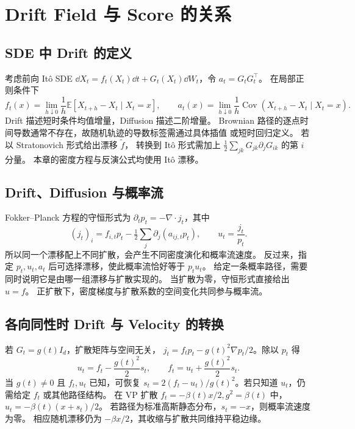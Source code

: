\section{Drift Field 与 Score 的关系}
\label{sec:fields-drift}

\subsection{SDE 中 Drift 的定义}

考虑前向 It\^o SDE
\(\dd X_t=f_t(X_t)\dd t+G_t(X_t)\dd W_t\)，令 \(a_t=G_tG_t^\top\)。
在局部正则条件下
\[
 f_t(x)=\lim_{h\downarrow0}\frac1h\mathbb E[X_{t+h}-X_t\mid X_t=x],
 \qquad
 a_t(x)=\lim_{h\downarrow0}\frac1h
       \operatorname{Cov}(X_{t+h}-X_t\mid X_t=x).
\]
Drift 描述短时条件均值增量，Diffusion 描述二阶增量。
Brownian 路径的逐点时间导数通常不存在，故随机轨迹的导数标签需通过具体插值
或短时回归定义。
若以 Stratonovich 形式给出漂移 \(\widetilde f\)，
转换到 It\^o 形式需加上
\(\frac12\sum_{jk}G_{jk}\partial_jG_{ik}\) 的第 \(i\) 分量。
本章的密度方程与反演公式均使用 It\^o 漂移。

\subsection{Drift、Diffusion 与概率流}

Fokker--Planck 方程的守恒形式为 \(\partial_t p_t=-\nabla\cdot j_t\)，其中
\begin{equation}
 (j_t)_i=f_{i,t}p_t-\tfrac12\sum_j\partial_j(a_{ij,t}p_t),\qquad
 u_t=\frac{j_t}{p_t}.
 \label{eq:fields-probability-current}
\end{equation}
所以同一个漂移配上不同扩散，会产生不同密度演化和概率流速度。
反过来，指定 \(p_t,u_t,a_t\) 后可选择漂移，使此概率流恰好等于 \(p_tu_t\)。
给定一条概率路径，需要同时说明它是由哪一组漂移与扩散实现的。
当扩散为零，守恒形式直接给出 \(u=f\)。
正扩散下，密度梯度与扩散系数的空间变化共同参与概率流。

\subsection{各向同性时 Drift 与 Velocity 的转换\requiredderivation}

若 \(G_t=g(t)I_d\)，扩散矩阵与空间无关，
\(j_t=f_tp_t-g(t)^2\nabla p_t/2\)。除以 \(p_t\) 得
\begin{equation}
 u_t=f_t-\frac{g(t)^2}{2}s_t,\qquad
 f_t=u_t+\frac{g(t)^2}{2}s_t.
 \label{eq:fields-isotropic-conversion}
\end{equation}
当 \(g(t)\ne0\) 且 \(f_t,u_t\) 已知，可恢复
\(s_t=2(f_t-u_t)/g(t)^2\)。若只知道 \(u_t\)，仍需给定 \(f_t\) 或其他路径结构。
在 VP 扩散 \(f_t=-\beta(t)x/2,g^2=\beta(t)\) 中，
\(u_t=-\beta(t)(x+s_t)/2\)。
若路径为标准高斯静态分布，\(s_t=-x\)，则概率流速度为零。
相应随机漂移仍为 \(-\beta x/2\)，其收缩与扩散共同维持平稳边缘。

